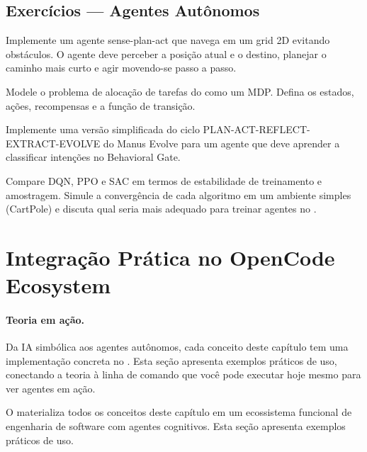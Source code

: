 \subsection{Exercícios — Agentes Autônomos}
\begin{exercicio}
Implemente um agente sense-plan-act que navega em um grid 2D evitando
obstáculos. O agente deve perceber a posição atual e o destino, planejar
o caminho mais curto e agir movendo-se passo a passo.
\end{exercicio}
\begin{exercicio}
Modele o problema de alocação de tarefas do \opencodeeco{} como um MDP.
Defina os estados, ações, recompensas e a função de transição.
\end{exercicio}
\begin{exercicio}
Implemente uma versão simplificada do ciclo PLAN-ACT-REFLECT-EXTRACT-EVOLVE
do Manus Evolve para um agente que deve aprender a classificar intenções
no Behavioral Gate.
\end{exercicio}
\begin{exercicio}
Compare DQN, PPO e SAC em termos de estabilidade de treinamento e
amostragem. Simule a convergência de cada algoritmo em um ambiente
simples (CartPole) e discuta qual seria mais adequado para treinar
agentes no \opencodeeco{}.
\end{exercicio}
\section{Integração Prática no OpenCode Ecosystem}
\label{sec:integração-pratica}

\paragraph{Teoria em ação.} Da IA simbólica aos agentes autônomos, cada
conceito deste capítulo tem uma implementação concreta no \opencodeeco{}.
Esta seção apresenta exemplos práticos de uso, conectando a teoria à
linha de comando que você pode executar hoje mesmo para ver agentes em ação.

O \opencodeeco{} materializa todos os conceitos deste capítulo em um
ecossistema funcional de engenharia de software com agentes cognitivos.
Esta seção apresenta exemplos práticos de uso.
